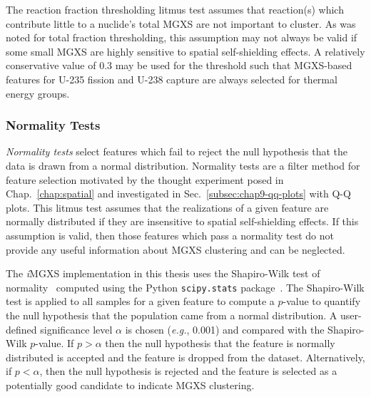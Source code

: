 The reaction fraction thresholding litmus test assumes that reaction(s) which contribute little to a nuclide's total \ac{MGXS} are not important to cluster. As was noted for total fraction thresholding, this assumption may not always be valid if some small \ac{MGXS} are highly sensitive to spatial self-shielding effects. A relatively conservative value of 0.3 may be used for the threshold such that \ac{MGXS}-based features for U-235 fission and U-238 capture are always selected for thermal energy groups.


\subsubsection{Normality Tests}
\label{subsubsec:chap10-litmus-normality}

\textit{Normality tests} select features which fail to reject the null hypothesis that the data is drawn from a normal distribution. Normality tests are a filter method for feature selection motivated by the thought experiment posed in Chap.~\ref{chap:spatial} and investigated in Sec.~\ref{subsec:chap9-qq-plots} with \ac{Q-Q} plots. This litmus test assumes that the realizations of a given feature are normally distributed if they are insensitive to spatial self-shielding effects. If this assumption is valid, then those features which pass a normality test do not provide any useful information about \ac{MGXS} clustering and can be neglected.

The \textit{i}\ac{MGXS} implementation in this thesis uses the Shapiro-Wilk test of normality~\cite{shapiro1965analysis} computed using the Python \texttt{scipy.stats} package~\cite{jones2011scipy}. The Shapiro-Wilk test is applied to all samples for a given feature to compute a $p$-value to quantify the null hypothesis that the population came from a normal distribution. A user-defined significance level $\alpha$ is chosen (\textit{e.g.}, 0.001) and compared with the Shapiro-Wilk $p$-value. If $p > \alpha$ then the null hypothesis that the feature is normally distributed is accepted and the feature is dropped from the dataset. Alternatively, if $p < \alpha$, then the null hypothesis is rejected and the feature is selected as a potentially good candidate to indicate \ac{MGXS} clustering.

